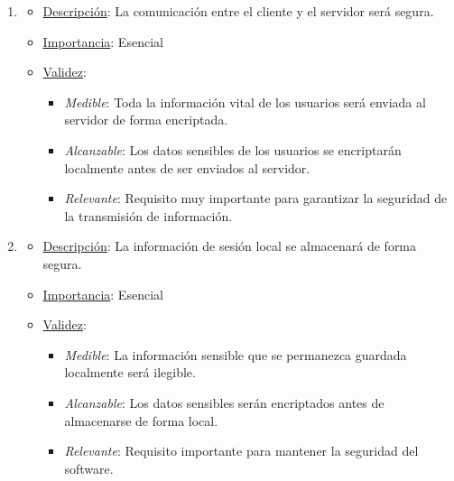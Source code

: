 \begin{enumerate}
\item %
  \begin{itemize}
  \item \underline{Descripción}: La comunicación entre el cliente y el servidor será segura.
  \item \underline{Importancia}: Esencial
  \item \underline{Validez}:
    \begin{itemize}
    \item \textit{Medible}: Toda la información vital de los usuarios será enviada al servidor de forma encriptada.
    \item \textit{Alcanzable}: Los datos sensibles de los usuarios se encriptarán localmente antes de ser enviados al servidor.
    \item \textit{Relevante}: Requisito muy importante para garantizar la seguridad de la transmisión de información.
    \end{itemize}
  \end{itemize}


\item %
  \begin{itemize}
  \item \underline{Descripción}: La información de sesión local se almacenará de forma segura.
  \item \underline{Importancia}: Esencial
  \item \underline{Validez}:
    \begin{itemize}
    \item \textit{Medible}: La información sensible que se permanezca guardada localmente será ilegible.
    \item \textit{Alcanzable}: Los datos sensibles serán encriptados antes de almacenarse de forma local.
    \item \textit{Relevante}: Requisito importante para mantener la seguridad del software.
    \end{itemize}
  \end{itemize}


\end{enumerate}
